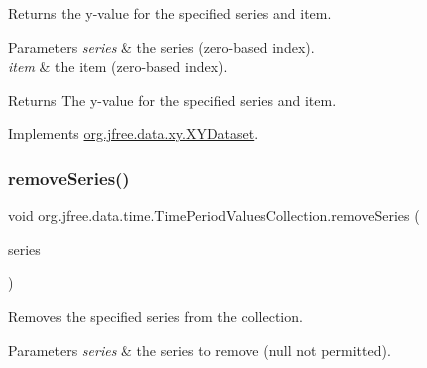 Returns the y-\/value for the specified series and item.


\begin{DoxyParams}{Parameters}
{\em series} & the series (zero-\/based index). \\
\hline
{\em item} & the item (zero-\/based index).\\
\hline
\end{DoxyParams}
\begin{DoxyReturn}{Returns}
The y-\/value for the specified series and item. 
\end{DoxyReturn}


Implements \mbox{\hyperlink{interfaceorg_1_1jfree_1_1data_1_1xy_1_1_x_y_dataset_aa915867221e0f94021bad3140db5254e}{org.\+jfree.\+data.\+xy.\+X\+Y\+Dataset}}.

\mbox{\label{classorg_1_1jfree_1_1data_1_1time_1_1_time_period_values_collection_ab429d9ab476c9ce6bc69c7f6dc4a77be}} 
\subsubsection{\texorpdfstring{remove\+Series()}{removeSeries()}\hspace{0.1cm}{\footnotesize\ttfamily [1/2]}}
{\footnotesize\ttfamily void org.\+jfree.\+data.\+time.\+Time\+Period\+Values\+Collection.\+remove\+Series (\begin{DoxyParamCaption}\item[{\mbox{\hyperlink{classorg_1_1jfree_1_1data_1_1time_1_1_time_period_values}{Time\+Period\+Values}}}]{series }\end{DoxyParamCaption})}

Removes the specified series from the collection.


\begin{DoxyParams}{Parameters}
{\em series} & the series to remove ({\ttfamily null} not permitted). \\
\hline
\end{DoxyParams}
\mbox{\label{classorg_1_1jfree_1_1data_1_1time_1_1_time_period_values_collection_a7db30a1ea121b62247779ab7a6a2f505}} 
